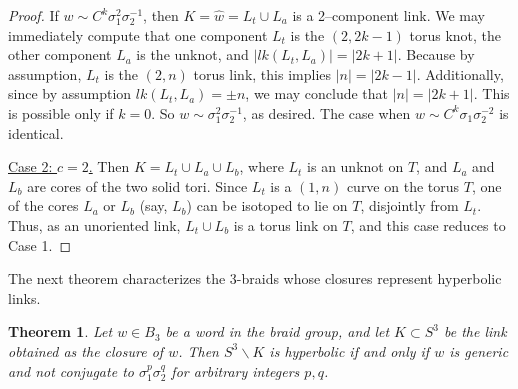 \documentclass[11pt]{amsart}
\renewcommand{\setminus}{{\smallsetminus}}
\newcommand{\abs}[1]{{\left\vert #1 \right\vert}}
\theoremstyle{plain}
\newtheorem{theorem}{Theorem}[section]
\theoremstyle{definition}
\begin{document}
\begin{proof}
If $w \sim C^k \sigma_1^{2} \sigma_2^{-1}$, then $K = \hat{w} = L_t
\cup L_a$ is a 2--component link.  We may immediately compute that one
component $L_t$ is the $(2, 2k-1)$ torus knot, the other component
$L_a$ is the unknot, and $\abs{lk(L_t, L_a)} = \abs{2k+1}$.  Because
by assumption, $L_t$ is the $(2, n)$ torus link, this implies
$\abs{n}=\abs{2k-1}$.  Additionally, since by assumption $lk(L_t,
L_a)=\pm n$, we may conclude that $\abs{n}=\abs{2k+1}$.  This is possible
only if $k=0$.  So $w \sim \sigma_1^2 \sigma_2^{-1}$, as desired.  The
case when $w \sim C^k \sigma_1 \sigma_2^{-2}$ is identical. 

\smallskip
\underline{Case 2: $c=2$.} Then $K = L_t \cup L_a \cup L_b$, where
$L_t$ is an unknot on $T$, and $L_a$ and $L_b$ are cores of the two
solid tori.  Since $L_t$ is a $(1,n)$ curve on the torus $T$, one of
the cores $L_a$ or $L_b$ (say, $L_b$) can be isotoped to lie on $T$,
disjointly from $L_t$. Thus, as an unoriented link, $L_t \cup L_b$ is a  torus link on
$T$, and this case reduces to Case 1.
\end{proof}


The next theorem characterizes the 3-braids whose closures  represent hyperbolic links.


\begin{theorem}\label{thm:hyperbolic-3braid}
Let $w \in B_3$ be a word in the braid group, and let $K \subset S^3$
be the link obtained as the closure of $w$. Then $S^3 \setminus K$ is
hyperbolic if and only if $w$ is generic and not conjugate to
$\sigma_1^p \sigma_2^q$ for arbitrary integers $p, q$.
\end{theorem}
\end{document}
